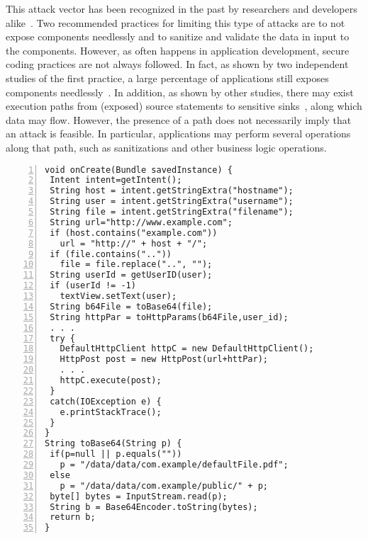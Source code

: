 This attack vector has been recognized in the past by researchers and developers alike~\cite{Lu:CHEX:2012,chin2011analyzing,AppIntent,IntentsForDevelopers}. Two recommended practices for limiting this type of attacks are to not expose components needlessly and to sanitize and validate the data in input to the components. However, as often happens in application development, secure coding practices are not always followed. In fact, as shown by two independent studies of the first practice, a large percentage of applications still exposes components needlessly~\cite{Epicc,chin2011analyzing}. In addition, as shown by other studies, there may exist execution paths from (exposed) source statements to sensitive sinks~\cite{Lu:CHEX:2012}, along which data may flow. However, the presence of a path does not necessarily imply that an attack is feasible. In particular, applications may perform several operations along that path, such as sanitizations and other business logic operations. 

\begin{lstlisting}[caption={Source code of a vulnerable application},label={lst:example},numbers=left,xleftmargin=1cm,basicstyle=\ttfamily\scriptsize ]
void onCreate(Bundle savedInstance) {
 Intent intent=getIntent();
 String host = intent.getStringExtra("hostname");
 String user = intent.getStringExtra("username");
 String file = intent.getStringExtra("filename");
 String url="http://www.example.com";
 if (host.contains("example.com"))
   url = "http://" + host + "/";
 if (file.contains(".."))
   file = file.replace("..", "");
 String userId = getUserID(user);
 if (userId != -1)
   textView.setText(user);
 String b64File = toBase64(file);
 String httpPar = toHttpParams(b64File,user_id);
 . . .
 try {
   DefaultHttpClient httpC = new DefaultHttpClient();
   HttpPost post = new HttpPost(url+httPar);
   . . .
   httpC.execute(post);
 }
 catch(IOException e) {
   e.printStackTrace();
 }
}
String toBase64(String p) {
 if(p=null || p.equals(""))
   p = "/data/data/com.example/defaultFile.pdf";
 else
   p = "/data/data/com.example/public/" + p;
 byte[] bytes = InputStream.read(p);
 String b = Base64Encoder.toString(bytes);
 return b;
}
\end{lstlisting}

